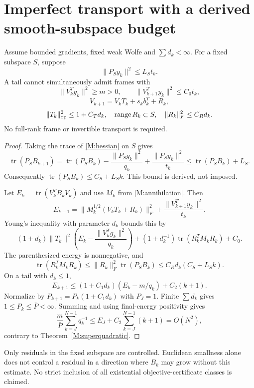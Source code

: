 \section{Imperfect transport with a derived smooth-subspace budget}
\label{M:residual}
\begin{theorem}\label{M:residualtheorem}
Assume bounded gradients, fixed weak Wolfe and $\sum d_k<\infty$. For a fixed subspace $S$, suppose
\[
 \|P_Sy_k\|^2\le L_St_k.
\]
A tail cannot simultaneously admit frames with
\[
 \|V_k^Tg_k\|^2\ge m>0,\qquad\|V_{k+1}^Ty_k\|^2\le C_0t_k,
\]
\[
 V_{k+1}=V_kT_k+s_kb_k^T+R_k,
\]
\[
 \|T_k\|_{\rm op}^2\le1+C_Td_k,\quad\operatorname{range}R_k\subset S,
 \quad\|R_k\|_F^2\le C_Rd_k.
\]
No full-rank frame or invertible transport is required.
\end{theorem}
\begin{proof}
Taking the trace of \eqref{M:hessian} on $S$ gives
\[
 \operatorname{tr}(P_SB_{k+1})
 =\operatorname{tr}(P_SB_k)-\frac{\|P_Sg_k\|^2}{q_k}
 +\frac{\|P_Sy_k\|^2}{t_k}
 \le\operatorname{tr}(P_SB_k)+L_S.
\]
Consequently $\operatorname{tr}(P_SB_k)\le C_S+L_Sk$. This bound is derived, not imposed.

Let $E_k=\operatorname{tr}(V_k^TB_kV_k)$ and use $M_k$ from \eqref{M:annihilation}. Then
\[
 E_{k+1}=\|M_k^{1/2}(V_kT_k+R_k)\|_F^2+\frac{\|V_{k+1}^Ty_k\|^2}{t_k}.
\]
Young's inequality with parameter $d_k$ bounds this by
\[
 (1+d_k)\|T_k\|^2\left(E_k-\frac{\|V_k^Tg_k\|^2}{q_k}\right)
 +(1+d_k^{-1})\operatorname{tr}(R_k^TM_kR_k)+C_0.
\]
The parenthesized energy is nonnegative, and
\[
 \operatorname{tr}(R_k^TM_kR_k)
 \le\|R_k\|_F^2\operatorname{tr}(P_SB_k)
 \le C_Rd_k(C_S+L_Sk).
\]
On a tail with $d_k\le1$,
\[
 E_{k+1}\le(1+C_1d_k)(E_k-m/q_k)+C_2(k+1).
\]
Normalize by $P_{k+1}=P_k(1+C_1d_k)$ with $P_J=1$. Finite $\sum d_k$ gives $1\le P_k\le\bar P<\infty$. Summing and using final-energy positivity gives
\[
 \frac m{\bar P}\sum_{k=J}^{N-1}q_k^{-1}
 \le E_J+C_2\sum_{k=J}^{N-1}(k+1)=O(N^2),
\]
contrary to Theorem~\ref{M:superquadratic}.
\end{proof}
Only residuals in the fixed subspace are controlled. Euclidean smallness alone does not control a residual in a direction where $B_k$ may grow without this estimate. No strict inclusion of all existential objective-certificate classes is claimed.
